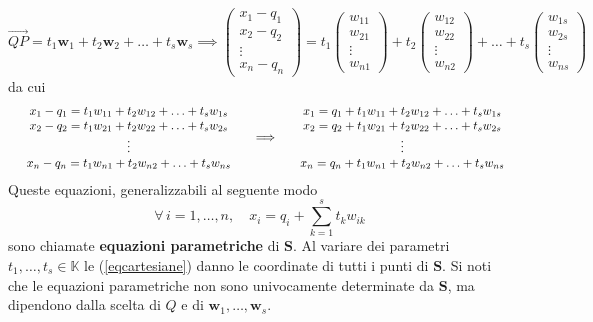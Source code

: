 \documentclass{article}
\theoremstyle{plain}
\theoremstyle{definition}
\theoremstyle{remark}
\begin{document}
\[\overrightarrow{QP}=t_1\mathbf{w}_1+t_2\mathbf{w}_2+\ldots+t_s\mathbf{w}_s
\implies\begin{pmatrix}
    x_1-q_1\\
    x_2-q_2\\
    \vdots\\
    x_n-q_n
\end{pmatrix}=t_1\begin{pmatrix}
    w_{11}\\
    w_{21}\\
    \vdots\\
    w_{n1}
\end{pmatrix}+t_2\begin{pmatrix}
    w_{12}\\
    w_{22}\\
    \vdots\\
    w_{n2}
\end{pmatrix}+\ldots+t_s\begin{pmatrix}
    w_{1s}\\
    w_{2s}\\
    \vdots\\
    w_{ns}
\end{pmatrix}\]
da cui 
\[
\begin{aligned}
    \begin{array}{rcl}
    &x_1 - q_1 =t_1 w_{11} + t_2 w_{12} + \ldots + t_s w_{1s} \\
    &x_2 - q_2 =  t_1 w_{21} + t_2 w_{22} + \ldots + t_s w_{2s} \\
    & \vdots \\
    &x_n - q_n =  t_1 w_{n1} + t_2 w_{n2} + \ldots + t_s w_{ns}
    \end{array}\quad\implies 
    \begin{array}{rcl}
        &x_1 =  q_1 + t_1 w_{11} + t_2 w_{12} + \ldots + t_s w_{1s} \\
        &x_2 =  q_2 +  t_1 w_{21} + t_2 w_{22} + \ldots + t_s w_{2s} \\
        & \vdots \\
        &x_n  = q_n + t_1 w_{n1} + t_2 w_{n2} + \ldots + t_s w_{ns}
        \end{array}
\end{aligned}\\
\]
Queste equazioni, generalizzabili al seguente modo
\begin{equation}\label{eqcartesiane}
    \forall\,i=1,\ldots,n,\quad x_i=q_i+\sum_{k=1}^{s}t_kw_{ik}    
\end{equation}
sono chiamate \textbf{equazioni parametriche} di $\mathbf{S}$.
Al variare dei parametri $t_1,\ldots,t_s\in\mathbb{K}$ le (\ref{eqcartesiane}) danno le coordinate di tutti i punti di $\mathbf{S}$.
Si noti che le equazioni parametriche non sono univocamente determinate da $\mathbf{S}$, ma dipendono dalla scelta di $Q$ e di $\mathbf{w}_1,\ldots,\mathbf{w}_s$.
\end{document}
